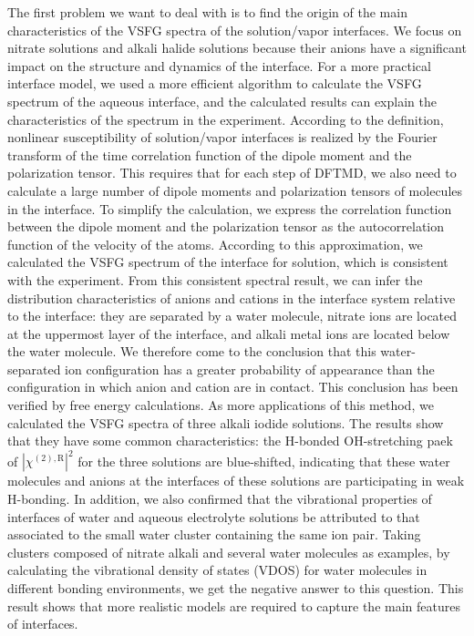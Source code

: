 The first problem we want to deal with is to find the origin of the main characteristics of the
VSFG spectra of the solution/vapor interfaces.
We focus on nitrate solutions and alkali halide solutions because their anions have a significant impact on the structure and dynamics of the interface.
For a more practical interface model, we used a more efficient algorithm to calculate the VSFG spectrum of the aqueous interface, 
and the calculated results can explain the characteristics of the spectrum in the experiment. 
According to the definition, nonlinear susceptibility of solution/vapor interfaces is realized by the Fourier transform of 
the time correlation function of the dipole moment and the polarization tensor. This requires that for each step of DFTMD, 
we also need to calculate a large number of dipole moments and polarization tensors of molecules in the interface. 
To simplify the calculation, we express the correlation function between the dipole moment and the polarization tensor 
as the autocorrelation function of the velocity of the atoms. 
According to this approximation, we calculated the VSFG spectrum of the interface for \LiN solution,
which is consistent with the experiment. From this consistent spectral result, we can infer the distribution characteristics of anions 
and cations in the interface system relative to the interface: they are separated by a water molecule, nitrate ions are located at the uppermost layer of the interface, 
and alkali metal ions are located below the water molecule. We therefore come to the conclusion that this water-separated ion configuration 
has a greater probability of appearance than the configuration in which anion and cation are in contact.
This conclusion has been verified by free energy calculations. 
As more applications of this method, we calculated the VSFG spectra of three alkali iodide solutions. 
The results show that they have some common characteristics: the H-bonded OH-stretching paek of $|\chi^{(2),\text{R}}|^2$ for the three solutions are
blue-shifted, indicating that these water molecules and anions at the interfaces of these solutions are participating in weak H-bonding.
In addition, we also confirmed that the vibrational properties of interfaces of water and aqueous electrolyte solutions be attributed to 
that associated to the small water cluster containing the same ion pair.
Taking clusters composed of nitrate alkali and several water molecules as examples, by calculating the vibrational density of states (VDOS) 
for water molecules in different bonding environments, we get the negative answer to this question. 
This result shows that more realistic models are required to capture the main features of interfaces.


